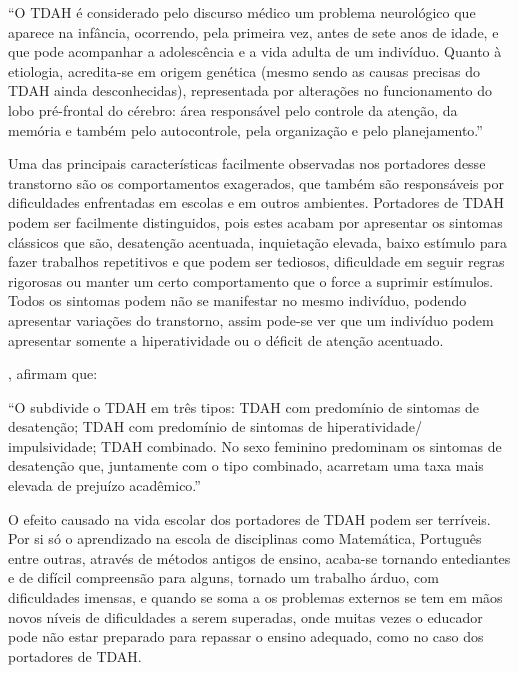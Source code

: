 \documentclass[
	12pt,				%
    oneside,			%
	a4paper,			%
	english,			%
	french,				%
	spanish,			%
	brazil,				%
	]{abntex2}
\begin{document}
	\begin{citacao}
		“O TDAH é considerado pelo discurso médico um problema neurológico que aparece na infância, ocorrendo, pela primeira vez, antes de sete anos de idade, e que pode acompanhar a adolescência e a vida adulta de um indivíduo. Quanto à etiologia, acredita-se em origem genética (mesmo sendo as causas precisas do TDAH ainda desconhecidas), representada por alterações no funcionamento do lobo pré-frontal do cérebro: área responsável pelo controle da atenção, da memória e também pelo autocontrole, pela organização e pelo planejamento.”
	\end{citacao}

	Uma das principais características facilmente observadas nos portadores desse transtorno são os comportamentos exagerados, que também são responsáveis por dificuldades enfrentadas em escolas e em outros ambientes. Portadores de TDAH podem ser facilmente distinguidos, pois estes acabam por apresentar os sintomas clássicos que são, desatenção acentuada, inquietação elevada, baixo estímulo para fazer trabalhos repetitivos e que podem ser tediosos, dificuldade em seguir regras rigorosas ou manter um certo comportamento que o force a suprimir estímulos. Todos os sintomas podem não se manifestar no mesmo indivíduo, podendo apresentar variações do transtorno, assim pode-se ver que um indivíduo podem apresentar somente a hiperatividade ou o déficit de atenção acentuado.
	
	
	, afirmam que:
	\begin{citacao}
		“O  subdivide o TDAH em três tipos: TDAH com predomínio de sintomas de desatenção; TDAH com predomínio de sintomas de hiperatividade/ impulsividade; TDAH combinado. No sexo feminino predominam os sintomas de desatenção que, juntamente com o tipo combinado, acarretam uma taxa mais elevada de prejuízo acadêmico.”
	\end{citacao}

	O efeito causado na vida escolar dos portadores de TDAH podem ser terríveis. Por si só o aprendizado na escola de disciplinas como Matemática, Português entre outras, através de métodos antigos de ensino, acaba-se tornando entediantes e de difícil compreensão para alguns, tornado um trabalho árduo, com dificuldades imensas, e quando se soma a os problemas externos se tem em mãos novos níveis de dificuldades a serem superadas, onde muitas vezes o educador pode não estar preparado para repassar o ensino adequado, como no caso dos portadores de TDAH.
	
\end{document}
